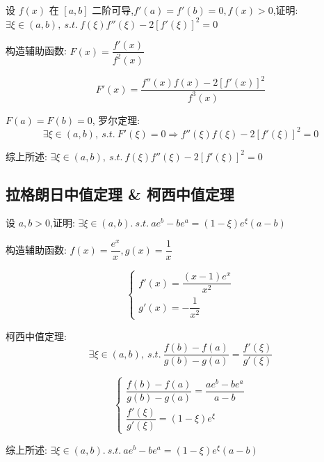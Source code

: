 \begin{proposition}
	设 $f(x)$ 在 $[a,b]$ 二阶可导,$f'(a)=f'(b)=0,f(x)>0$,证明: $\exists \xi\in(a,b),\ s.t.\ f(\xi)f''(\xi)-2[f'(\xi)]^2=0$
\end{proposition}
\begin{solution}

	构造辅助函数: $F(x)=\dfrac{f'(x)}{f^{2}(x)}$

	$$F'(x)=\dfrac{f''(x)f(x)-2[f'(x)]^2}{f^{3}(x)}$$

	$F(a) = F(b) = 0$, 罗尔定理:
	$$\exists \xi\in(a,b),\ s.t.\ F'(\xi)=0\Rightarrow f''(\xi)f(\xi)-2[f'(\xi)]^2=0$$

	综上所述: $\exists \xi\in(a,b),\ s.t.\ f(\xi)f''(\xi)-2[f'(\xi)]^2=0$
\end{solution}

\subsection{拉格朗日中值定理 \& 柯西中值定理}

\begin{proposition}
	设 $a,b>0$,证明: $\exists \xi\in(a,b).\ s.t.\ ae^b-be^a=(1-\xi)e^{\xi}(a-b)$
\end{proposition}
\begin{solution}

	构造辅助函数: $f(x)=\dfrac{e^{x}}{x},g(x)=\dfrac{1}{x}$

	$$\begin{cases}
		f'(x) = \dfrac{(x-1)e^{x}}{x^{2}}\\
		g'(x) = -\dfrac{1}{x^{2}}
	\end{cases}$$

	柯西中值定理:
	$$\exists \xi\in(a,b),\ s.t.\ \dfrac{f(b)-f(a)}{g(b)-g(a)}=\dfrac{f'(\xi)}{g'(\xi)}$$


	$$\begin{cases}
		\dfrac{f(b)-f(a)}{g(b)-g(a)}=\dfrac{ae^b-be^a}{a-b} \\
		\dfrac{f'(\xi)}{g'(\xi)}=(1-\xi)e^{\xi}
	\end{cases}$$

	综上所述: $\exists \xi\in(a,b).\ s.t.\ ae^b-be^a=(1-\xi)e^{\xi}(a-b)$
\end{solution}

